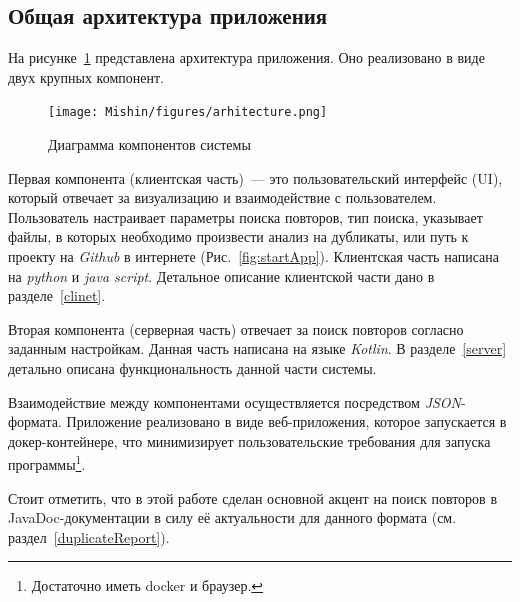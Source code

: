 

\subsection{Общая архитектура приложения}
На рисунке~\ref{fig:application} представлена архитектура приложения.
Оно реализовано в виде двух крупных компонент.

\begin{figure}[H]
    \texttt{[image: Mishin/figures/arhitecture.png]}
    \caption{Диаграмма компонентов системы}\label{fig:application}
\end{figure}


Первая компонента (клиентская часть)~--- это пользовательский интерфейс ({UI}), который  отвечает за визуализацию и взаимодействие с пользователем.
Пользователь настраивает параметры поиска повторов, тип поиска, указывает файлы, в которых необходимо произвести анализ на дубликаты, или путь к проекту на \emph{Github} в интернете (Рис.~\ref{fig:startApp}).
Клиентская часть написана на \emph{python} и \emph{java script}.
Детальное описание клиентской части дано в разделе~\ref{clinet}.

Вторая компонента (серверная часть) отвечает за поиск повторов согласно заданным настройкам.
Данная часть написана на языке \emph{Kotlin}.
В разделе~\ref{server} детально описана функциональность данной части системы.

Взаимодействие между компонентами осуществляется посредством \emph{JSON}-формата.
Приложение реализовано в виде веб-приложения, которое запускается в докер-контейнере, что минимизирует пользовательские требования для запуска программы\footnote{Достаточно иметь docker и браузер.}.




Стоит отметить, что в этой работе сделан основной акцент на поиск повторов в JavaDoc-документации в силу её актуальности для данного формата (см. раздел~\ref{duplicateReport}).

